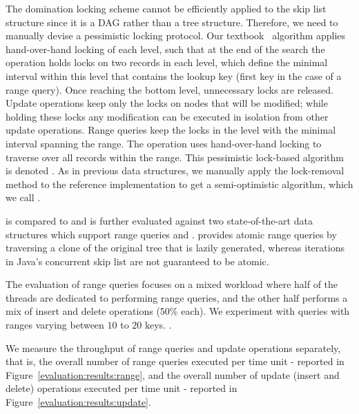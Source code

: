 The domination locking scheme cannot be efficiently applied to the skip list
structure since it is a DAG rather than a tree structure. Therefore, we need to
manually devise a pessimistic locking protocol. Our
textbook~\cite{HerlihyS2008} algorithm applies hand-over-hand locking of each
level, such that at the end of the search the operation holds locks on two
records in each level, which define the minimal interval within this level that
contains the lookup key (first key in the case of a range query). Once reaching
the bottom level, unnecessary locks are released. Update operations keep only
the locks on nodes that will be modified; while holding these locks any
modification can be executed in isolation from other update operations. Range
queries keep the locks in the level with the minimal interval spanning the
range. The operation uses hand-over-hand locking to traverse over all records
within the range. This pessimistic lock-based algorithm is denoted \domSkiplist. 
As in previous data structures, we manually apply the lock-removal method to the
reference implementation to get a semi-optimistic algorithm, which we call
\autoSkiplist.  

\autoSkiplist is compared to \domSkiplist and is further evaluated against two
state-of-the-art data structures which support range queries \bronson and \skiplist.
\bronson provides atomic range queries by traversing a clone of the
original tree that is lazily generated,
whereas iterations in Java's concurrent skip list are not
guaranteed to be atomic.

The evaluation of range queries focuses on a mixed workload where half of the
threads are dedicated to performing range queries, and the other half performs a
mix of insert and delete operations (50\% each). 
We experiment with queries with ranges varying between $10$ to $20$
keys.
.

We measure the throughput of range queries and update operations separately,
that is, the overall number of range queries executed per time unit - reported
in Figure~\ref{evaluation:results:range}, and the overall number of update (insert and
delete) operations executed per time unit - reported in
Figure~\ref{evaluation:results:update}.

% 

